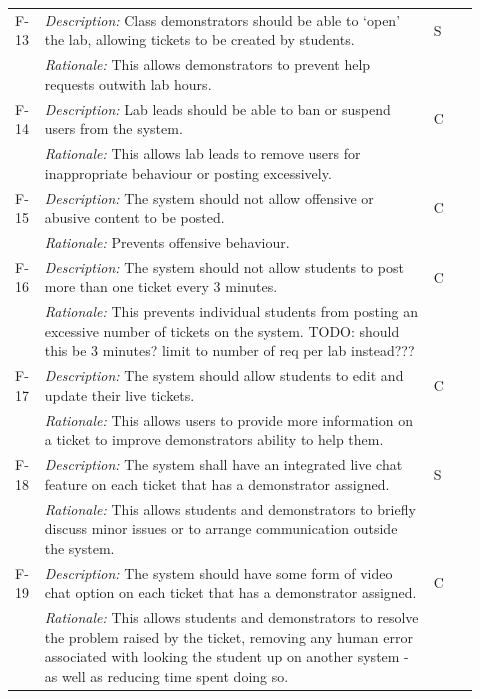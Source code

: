 \begin{table}[H]
\small
\begin{tabular}{|p{0.05\linewidth} | p{0.78\linewidth} |p{0.09\linewidth}|}
  
          \hline
 F-13 & \textit{Description:} Class demonstrators should be able to `open' the lab, allowing tickets to be created by students. & S\\
  \cline{2-2}
  & \textit{Rationale:} This allows demonstrators to prevent help requests outwith lab hours. & \\

  
\hline\hline
 F-14 & \textit{Description:} Lab leads should be able to ban or suspend users from the system. & C\\
  \cline{2-2}
  & \textit{Rationale:} This allows lab leads to remove users for inappropriate behaviour or posting excessively. & \\
 
 \hline\hline
 F-15 & \textit{Description:} The system should not allow offensive or abusive content to be posted. & C\\
  \cline{2-2}
  & \textit{Rationale:} Prevents offensive behaviour. & \\
 
 \hline\hline
 F-16 & \textit{Description:} The system should not allow students to post more than one ticket every 3 minutes. & C\\
  \cline{2-2}
  & \textit{Rationale:} This prevents individual students from posting an excessive number of tickets on the system. TODO: should this be 3 minutes? limit to number of req per lab instead??? & \\
 
  \hline\hline
 F-17 & \textit{Description:} The system should allow students to edit and update their live tickets. & C\\
  \cline{2-2}
  & \textit{Rationale:}  This allows users to provide more information on a ticket to improve demonstrators ability to help them. & \\
 
   \hline\hline
 F-18 & \textit{Description:} The system shall have an integrated live chat feature on each ticket that has a demonstrator assigned. & S\\
  \cline{2-2}
  & \textit{Rationale:} This allows students and demonstrators to briefly discuss minor issues or to arrange communication outside the system. & \\

   \hline\hline
 F-19 & \textit{Description:} The system should have some form of video chat option on each ticket that has a demonstrator assigned. & C\\
  \cline{2-2}
  & \textit{Rationale:} This allows students and demonstrators to resolve the problem raised by the ticket, removing any human error associated with looking the student up on another system - as well as reducing time spent doing so. & \\


\end{tabular}
\end{table}
